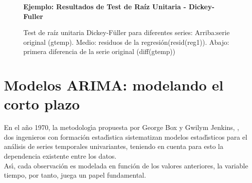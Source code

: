 \begin{figure}[H]
	\centering
	\textbf{Ejemplo: Resultados de Test de Raíz Unitaria - Dickey-Fuller}\par\medskip
	\caption{Test de raíz unitaria Dickey-Füller para diferentes series: Arriba:serie original (gtemp). Medio: residuos de la regresión(resid(reg1)). Abajo: primera diferencia de la serie original (diff(gtemp))}\label{fig5}
\end{figure}
%
\pagebreak\section{Modelos ARIMA: modelando el corto plazo}

En el a\~no 1970, la metodolog\'{\i}a propuesta por George Box y Gwilym Jenkins, \cite{BoxJenkins} , dos ingenieros con formaci\'on estad\'{\i}stica sistematizan modelos estad\'{\i}sticos para el an\'alisis de series temporales univariantes, teniendo en cuenta para esto la dependencia existente entre los datos. \\
As\'{\i}, cada observaci\'on es modelada en funci\'on de los valores anteriores, la variable tiempo, por tanto, juega un papel fundamental. 

